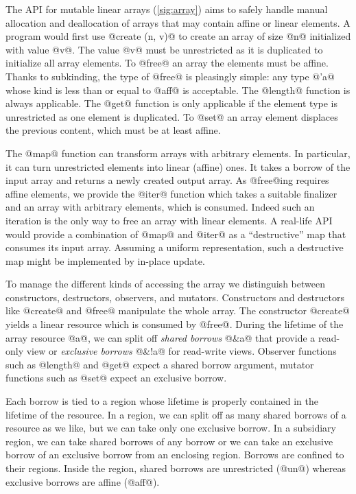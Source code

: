 The API for mutable linear arrays (\cref{sig:array})
aims to safely handle manual allocation and
deallocation of arrays that may contain affine or linear elements.
A program would first use @create (n, v)@ to create
an array of size @n@ initialized with value
@v@. The value @v@ must be unrestricted as it is duplicated to
initialize all array elements.
To @free@ an array the elements must be affine. Thanks to subkinding,
the type of @free@ is pleasingly simple: any type @'a@ whose kind is
less than or equal to @aff@ is acceptable. 
The @length@ function is always applicable.
The @get@ function is only applicable
if the element type is unrestricted as one element is duplicated.
To @set@ an array element displaces the previous content, which must
be at least affine.

The @map@ function can transform arrays with arbitrary elements. In 
particular, it can turn unrestricted elements into linear (affine)
ones. It takes a borrow of the input array and returns a newly created
output array. As @free@ing requires affine elements, we provide the
@iter@ function which takes a
suitable finalizer and an array with arbitrary elements, which is
consumed. Indeed such an iteration is the only way to free an array
with linear elements. A real-life
API would provide a combination of @map@ and @iter@ as a
``destructive'' map that consumes its input array. Assuming a uniform
representation, such a destructive map might be implemented by
in-place update.

To manage the different kinds of accessing the array we distinguish between constructors, destructors,
observers, and mutators.
Constructors and destructors like @create@ and @free@ manipulate the whole
array. %
The constructor
@create@ yields a linear resource which is consumed by @free@.
During the lifetime of the array resource @a@, we can split
off \emph{shared borrows} @&a@ that provide a read-only
view or \emph{exclusive borrows} @&!a@ for read-write views.
Observer functions such as @length@ and @get@ expect a shared borrow
argument, mutator functions such as @set@ expect
an exclusive borrow.

Each borrow is tied to a region whose lifetime is properly
contained in the lifetime of the resource.
In a region, we can split off as many shared borrows of a resource as
we like, but we can take only one exclusive borrow. In a
subsidiary region, we can take shared borrows of any
borrow or we can take an exclusive borrow of an exclusive borrow from an
enclosing region. Borrows are confined to their regions. Inside the region,
shared borrows are unrestricted (@un@) whereas exclusive
borrows are affine (@aff@).

